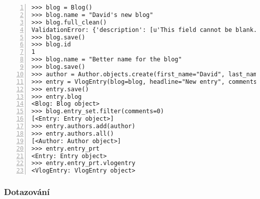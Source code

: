 \documentclass[ing,male,java,dept456]{diploma}						%
\begin{document}
\begin{lstlisting}[style=custompython, numbers=left, label=src:Basic, caption={Ukázka práce s instancí, relacemi a dědičností}]
>>> blog = Blog()
>>> blog.name = "David's new blog"
>>> blog.full_clean()
ValidationError: {'description': [u'This field cannot be blank.']}
>>> blog.save()
>>> blog.id
1
>>> blog.name = "Better name for the blog"
>>> blog.save()
>>> author = Author.objects.create(first_name="David", last_name="Krutký", email="david.krutky.st@vsb.cz")
>>> entry = VlogEntry(blog=blog, headline="New entry", comments=0, rating=0, video="http://example.com")
>>> entry.save()
>>> entry.blog
<Blog: Blog object>
>>> blog.entry_set.filter(comments=0)
[<Entry: Entry object>]
>>> entry.authors.add(author)
>>> entry.authors.all()
[<Author: Author object>]
>>> entry.entry_prt
<Entry: Entry object>
>>> entry.entry_prt.vlogentry
<VlogEntry: VlogEntry object>
\end{lstlisting}

\subsubsection{Dotazování}
\end{document}
